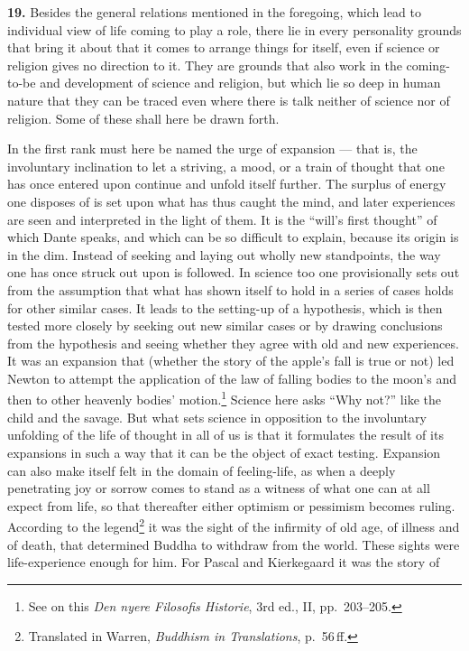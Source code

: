 \documentclass[12pt]{book}
\newcommand{\hnum}[1]{\textbf{#1.}\enspace}
\newcommand{\opage}[1]{\marginnote{\footnotesize\textit{[#1]}}}
\begin{document}
\hnum{19} Besides the general relations mentioned in the foregoing, which lead to individual view of life
coming to play a role, there lie in every personality grounds that bring it about that it comes to arrange
things for itself, even if science or religion gives no direction to it. They are grounds that also work in
the coming-to-be and development of science and religion, but which lie so deep in human nature that they
can be traced even where there is talk neither of science nor of religion. Some of these shall here be
drawn forth.

In the first rank must here be named the urge of expansion --- that is, the involuntary inclination to let
a striving, a mood, or a train of thought that one has once entered upon continue and unfold itself
further. The surplus of energy one disposes of is set upon what has thus caught the mind, and later
experiences are seen and interpreted in the light of them. It is the ``will's first thought'' of which
Dante speaks, and which can be so \opage{56}difficult to explain, because its origin is in the dim. Instead of
seeking and laying out wholly new standpoints, the way one has once struck out upon is followed. In science
too one provisionally sets out from the assumption that what has shown itself to hold in a series of cases
holds for other similar cases. It leads to the setting-up of a hypothesis, which is then tested more
closely by seeking out new similar cases or by drawing conclusions from the hypothesis and seeing whether
they agree with old and new experiences. It was an expansion that (whether the story of the apple's fall is
true or not) led Newton to attempt the application of the law of falling bodies to the moon's and then to
other heavenly bodies' motion.\footnote{See on this \textit{Den nyere Filosofis Historie}, 3rd ed., II,
pp.\ 203--205.} Science here asks ``Why not?'' like the child and the savage. But what sets science in
opposition to the involuntary unfolding of the life of thought in all of us is that it formulates the result
of its expansions in such a way that it can be the object of exact testing. Expansion can also make itself
felt in the domain of feeling-life, as when a deeply penetrating joy or sorrow comes to stand as a witness
of what one can at all expect from life, so that thereafter either optimism or pessimism becomes ruling.
According to the legend\footnote{Translated in Warren, \textit{Buddhism in Translations}, p.\ 56\,ff.} it
was the sight of the infirmity of old age, of illness and of death, that determined Buddha to withdraw from
the world. These sights were life-experience enough for him. For Pascal and Kierkegaard it was the story of
\end{document}
